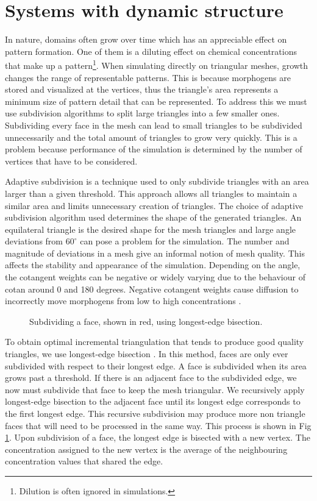 \section{Systems with dynamic structure}
In nature, domains often grow over time which has an appreciable effect on pattern formation. One of them is a diluting effect on chemical concentrations that make up a pattern\footnote{Dilution is often ignored in simulations.}. When simulating directly on triangular meshes, growth changes the range of representable patterns. This is because morphogens are stored and visualized at the vertices, thus the triangle's area represents a minimum size of pattern detail that can be represented. To address this we must use subdivision algorithms to split large triangles into a few smaller ones. Subdividing every face in the mesh can lead to small triangles to be subdivided unnecessarily and the total amount of triangles to grow very quickly. This is a problem because performance of the simulation is determined by the number of vertices that have to be considered. 

Adaptive subdivision is a technique used to only subdivide triangles with an area larger than a given threshold. This approach allows all triangles to maintain a similar area and limits unnecessary creation of triangles. The choice of adaptive subdivision algorithm used determines the shape of the generated triangles. An equilateral triangle is the desired shape for the mesh triangles and large angle deviations from $60^{\circ}$ can pose a problem for the simulation. The number and magnitude of deviations in a mesh give an informal notion of mesh quality. This affects the stability and appearance of the simulation. Depending on the angle, the cotangent weights can be negative or widely varying due to the behaviour of cotan around 0 and 180 degrees. Negative cotangent weights cause diffusion to incorrectly move morphogens from low to high concentrations \citep{Wardetzky2007}. 

\begin{figure}[H]
	\centering
	\caption{Subdividing a face, shown in red, using longest-edge bisection.}
	\label{fig:recursiveSubdiv}
\end{figure}

To obtain optimal incremental triangulation that tends to produce good quality triangles, we use longest-edge bisection \citep{RIVARA1998}. In this method, faces are only ever subdivided with respect to their longest edge. A face is subdivided when its area grows past a threshold. If there is an adjacent face to the subdivided edge, we now must subdivide that face to keep the mesh triangular. We recursively apply longest-edge bisection to the adjacent face until its longest edge corresponds to the first longest edge. This recursive subdivision may produce more non triangle faces that will need to be processed in the same way. This process is shown in Fig \ref{fig:recursiveSubdiv}. Upon subdivision of a face, the longest edge is bisected with a new vertex. The concentration assigned to the new vertex is the average of the neighbouring concentration values that shared the edge.


